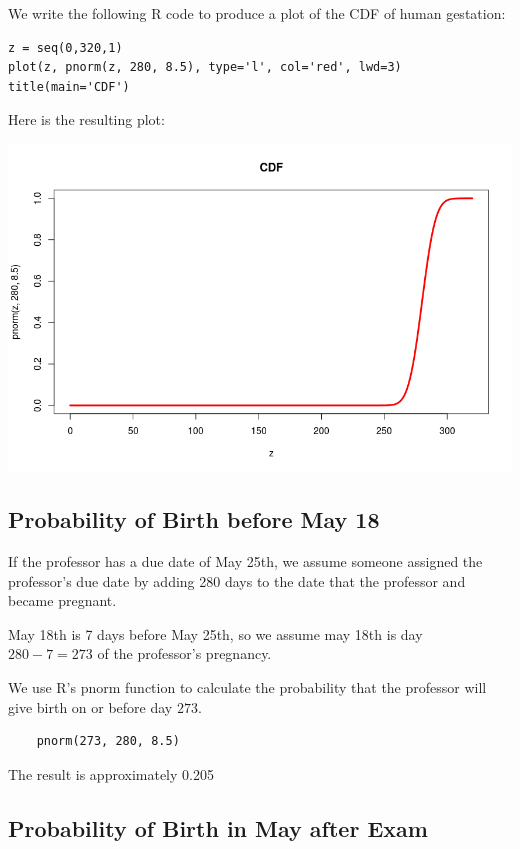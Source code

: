 \documentclass[a4paper,11pt]{article}
\begin{document}
We write the following R code to produce a plot of the CDF of human gestation:

\begin{lstlisting}
z = seq(0,320,1)
plot(z, pnorm(z, 280, 8.5), type='l', col='red', lwd=3)
title(main='CDF')
\end{lstlisting}

Here is the resulting plot:
\begin{center}
\includegraphics[scale=0.5]{cdf-gestation}
\end{center}

\subsection{Probability of Birth before May 18}

If the professor has a due date of May 25th, we assume someone assigned the
professor's due date by adding 280 days to the date that the professor and
became pregnant.

May 18th is 7 days before May 25th, so we assume may 18th is day $280-7=273$
of the professor's pregnancy.

We use R's pnorm function to calculate the probability that the professor will
give birth on or before day $273$.

\begin{lstlisting}
	pnorm(273, 280, 8.5)
\end{lstlisting}

The result is approximately 0.205

\subsection{Probability of Birth in May after Exam}
\end{document}
